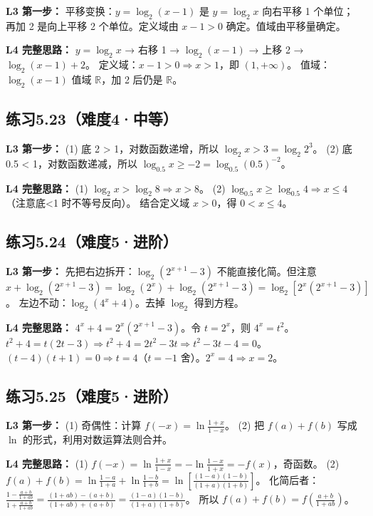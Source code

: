 \textbf{L3 第一步：}
平移变换：\(y = \log_2(x-1)\) 是 \(y = \log_2 x\) 向右平移 1 个单位；
再加 2 是向上平移 2 个单位。定义域由 \(x-1 > 0\) 确定。值域由平移量确定。

\textbf{L4 完整思路：}
\(y = \log_2 x\) → 右移 1 → \(\log_2(x-1)\) → 上移 2 → \(\log_2(x-1)+2\)。
定义域：\(x-1 > 0 \Rightarrow x > 1\)，即 \((1, +\infty)\)。
值域：\(\log_2(x-1)\) 值域 \(\mathbb{R}\)，加 2 后仍是 \(\mathbb{R}\)。

\subsection*{练习5.23（难度4·中等）}

\textbf{L3 第一步：}
(1) 底 2 > 1，对数函数递增，所以 \(\log_2 x > 3 = \log_2 2^3\)。
(2) 底 0.5 < 1，对数函数递减，所以 \(\log_{0.5} x \ge -2 = \log_{0.5} (0.5)^{-2}\)。

\textbf{L4 完整思路：}
(1) \(\log_2 x > \log_2 8 \Rightarrow x > 8\)。
(2) \(\log_{0.5} x \ge \log_{0.5} 4 \Rightarrow x \le 4\)（注意底<1 时不等号反向）。
结合定义域 \(x > 0\)，得 \(0 < x \le 4\)。

\subsection*{练习5.24（难度5·进阶）}

\textbf{L3 第一步：}
先把右边拆开：\(\log_2(2^{x+1} - 3)\) 不能直接化简。但注意 \(x + \log_2(2^{x+1} - 3) = \log_2(2^x) + \log_2(2^{x+1} - 3) = \log_2[2^x(2^{x+1} - 3)]\)。
左边不动：\(\log_2(4^x + 4)\)。去掉 \(\log_2\) 得到方程。

\textbf{L4 完整思路：}
\(4^x + 4 = 2^x(2^{x+1} - 3)\)。令 \(t = 2^x\)，则 \(4^x = t^2\)。
\(t^2 + 4 = t(2t - 3) \Rightarrow t^2 + 4 = 2t^2 - 3t \Rightarrow t^2 - 3t - 4 = 0\)。
\((t-4)(t+1)=0 \Rightarrow t=4\)（\(t=-1\) 舍）。\(2^x = 4 \Rightarrow x = 2\)。

\subsection*{练习5.25（难度5·进阶）}

\textbf{L3 第一步：}
(1) 奇偶性：计算 \(f(-x) = \ln\frac{1+x}{1-x}\)。
(2) 把 \(f(a) + f(b)\) 写成 \(\ln\) 的形式，利用对数运算法则合并。

\textbf{L4 完整思路：}
(1) \(f(-x) = \ln\frac{1+x}{1-x} = -\ln\frac{1-x}{1+x} = -f(x)\)，奇函数。
(2) \(f(a) + f(b) = \ln\frac{1-a}{1+a} + \ln\frac{1-b}{1+b} = \ln\left[\frac{(1-a)(1-b)}{(1+a)(1+b)}\right]\)。
化简后者：\(\frac{1 - \frac{a+b}{1+ab}}{1 + \frac{a+b}{1+ab}} = \frac{(1+ab)-(a+b)}{(1+ab)+(a+b)} = \frac{(1-a)(1-b)}{(1+a)(1+b)}\)。
所以 \(f(a) + f(b) = f\left(\frac{a+b}{1+ab}\right)\)。

